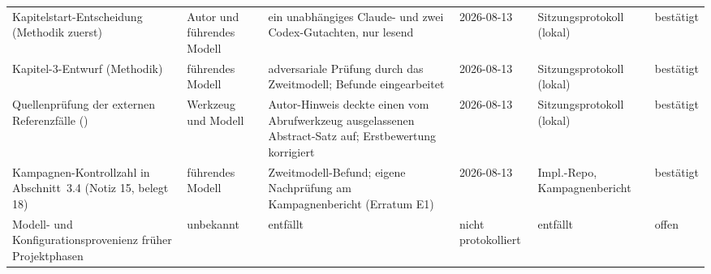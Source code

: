 \begin{footnotesize}
\begin{longtable}{@{}L{3.7cm}L{1.7cm}L{2.3cm}L{1.5cm}L{2.0cm}L{1.3cm}@{}}
  Kapitelstart-Entscheidung (Methodik zuerst)
    & Autor und führendes Modell
    & ein unabhängiges Claude- und zwei Codex-Gutachten, nur lesend
    & 2026-08-13
    & Sitzungsprotokoll (lokal)
    & bestätigt \\
  Kapitel-3-Entwurf (Methodik)
    & führendes Modell
    & adversariale Prüfung durch das Zweitmodell; Befunde eingearbeitet
    & 2026-08-13
    & Sitzungsprotokoll (lokal)
    & bestätigt \\
  Quellenprüfung der externen Referenzfälle ()
    & Werkzeug und Modell
    & Autor-Hinweis deckte einen vom Abrufwerkzeug ausgelassenen Abstract-Satz auf; Erstbewertung korrigiert
    & 2026-08-13
    & Sitzungsprotokoll (lokal)
    & bestätigt \\
  Kampagnen-Kontrollzahl in Abschnitt~3.4 (Notiz 15, belegt 18)
    & führendes Modell
    & Zweitmodell-Befund; eigene Nachprüfung am Kampagnenbericht (Erratum E1)
    & 2026-08-13
    & Impl.-Repo, Kampagnenbericht
    & bestätigt \\
  Modell- und Konfigurationsprovenienz früher Projektphasen
    & unbekannt
    & entfällt
    & nicht protokolliert
    & entfällt
    & offen \\
\end{longtable}
\end{footnotesize}
